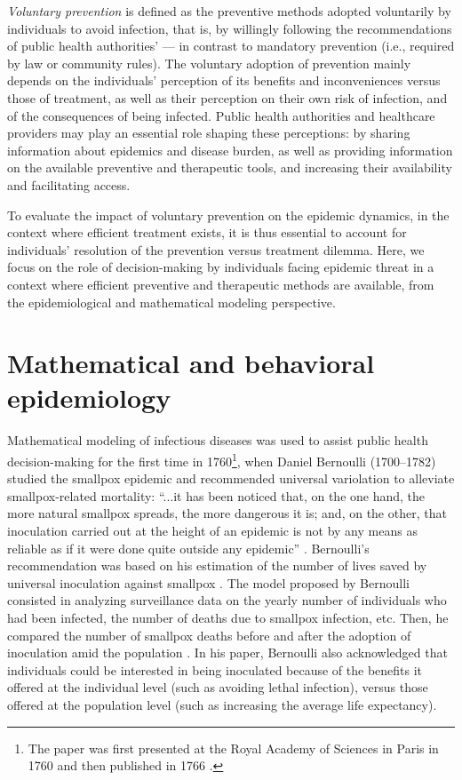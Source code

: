 \textit{Voluntary prevention} is defined as the preventive methods adopted voluntarily by individuals to avoid infection, that is, by willingly following the recommendations of public health authorities' --- in contrast to mandatory prevention (i.e., required by law or community rules). The voluntary adoption of prevention mainly depends on the individuals' perception of its benefits and inconveniences versus those of treatment, as well as their perception on their own risk of infection, and of the consequences of being infected. Public health authorities and healthcare providers may play an essential role shaping these perceptions: by sharing information about epidemics and disease burden, as well as providing information on the available preventive and therapeutic tools, and increasing their availability and facilitating access.%

To evaluate the impact of voluntary prevention on the epidemic dynamics, in the context where efficient treatment exists, it is thus essential to account for individuals' resolution of the prevention versus treatment dilemma. Here, we focus on the role of decision-making by individuals facing epidemic threat in a context where efficient preventive and therapeutic methods are available, from the epidemiological and mathematical modeling perspective.

\section{Mathematical and behavioral epidemiology}
\label{Intro:BehavEpi} 

Mathematical modeling of infectious diseases was used to assist public health decision-making for the first time in 1760\footnote{The paper was first presented at the Royal Academy of Sciences in Paris in 1760 and then published in 1766 \cite[]{Bernoulli1766}.}, when Daniel Bernoulli (1700--1782) studied the smallpox epidemic and recommended universal variolation to alleviate smallpox-related mortality: ``...it has been noticed that, on the one hand, the more natural smallpox spreads, the more dangerous it is; and, on the other, that inoculation carried out at the height of an epidemic is not by any means as reliable as if it were done quite outside any epidemic'' \cite[]{Blower2004}. Bernoulli's recommendation was based on his estimation of the number of lives saved by universal inoculation against smallpox \cite[]{Blower2004}. The model proposed by Bernoulli consisted in analyzing surveillance data on the yearly number of individuals who had been infected, the number of deaths due to smallpox infection, etc. Then, he compared the number of smallpox deaths before and after the adoption of inoculation amid the population \cite[]{Blower2004,Dietz2002}. In his paper, Bernoulli also acknowledged that individuals could be interested in being inoculated because of the benefits it offered at the individual level (such as avoiding lethal infection), versus those offered at the population level (such as increasing the average life expectancy).

